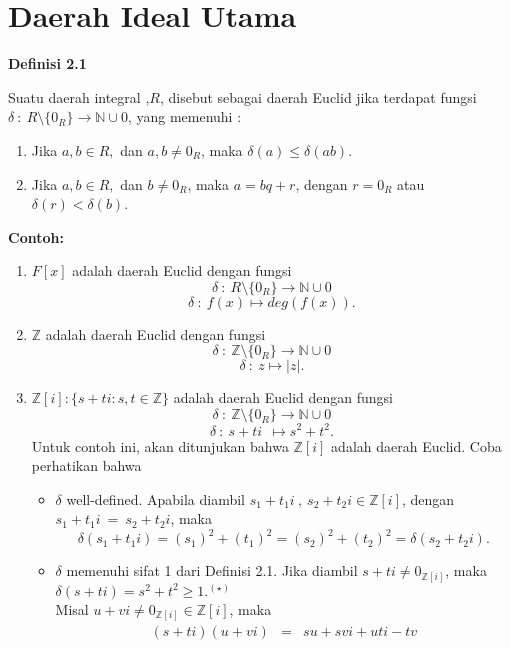 
\chapter{Daerah Ideal Utama}
\textbf{Definisi 2.1}
\par 	Suatu daerah integral ,$R$, disebut sebagai daerah Euclid  jika terdapat fungsi $\delta~:~ R\setminus \{0_R\} \rightarrow \mathbb{N}\cup {0}$, yang memenuhi : 
	\begin{enumerate}
	\item Jika $a,b \in R,$ dan $a,b \ne 0_R$, maka $ \delta(a) \le \delta (ab).$
	\item Jika $a,b \in R,$ dan $b \ne 0_R$, maka $a=bq+r$, dengan $r=0_R$ atau $\delta (r) < \delta(b)$.
	\end{enumerate}
	\textbf{Contoh:}
	\begin{enumerate}
	\item $F[x]$ adalah daerah Euclid dengan fungsi $$\delta~:~ R\setminus \{0_R\} \rightarrow \mathbb{N}\cup {0}$$ $$\delta~:~f(x) \mapsto deg(f(x)).$$
	\item $\mathbb{Z}$ adalah daerah Euclid dengan fungsi $$\delta~:~ \mathbb{Z}\setminus \{0_R\} \rightarrow \mathbb{N}\cup {0}$$ $$\delta~:~z \mapsto |z|.$$
	\item $\mathbb{Z}[\textit{i}] : \{ s + t\textit{i} : s,t \in \mathbb{Z}\}$ adalah daerah Euclid dengan fungsi $$\delta~:~ \mathbb{Z}\setminus \{0_R\} \rightarrow \mathbb{N}\cup {0}$$  $$\delta~:~  s + t\textit{i}~~\mapsto s^2+t^2.$$
	Untuk contoh ini, akan ditunjukan bahwa $\mathbb{Z}[\textit{i}]$ adalah daerah Euclid. Coba perhatikan bahwa
		\begin{itemize}
		\item $\delta$ well-defined. Apabila diambil  $s_1 + t_1\textit{i}~,~ s_2 + t_2\textit{i} \in \mathbb{Z}[\textit{i}]$, dengan $s_1 + t_1\textit{i}~=~ s_2 + t_2\textit{i}$, maka $$\delta(s_1 + t_1\textit{i}) = (s_1)^2 + (t_1)^2 = (s_2)^2 + (t_2)^2= \delta(s_2 +                                                         
		t_2\textit{i}).$$
		\item $\delta$ memenuhi sifat 1 dari Definisi 2.1.  Jika diambil $s+ t\textit{i} \ne 0_{\mathbb{Z}[\textit{i}]}$, maka $\delta (s+ t\textit{i}) = s^2 +t^2 \ge 1.^{(\star)} $ 
\\		Misal $u+ v\textit{i} \ne 0_{\mathbb{Z}[\textit{i}]} \in \mathbb{Z}[\textit{i}]$, maka
			$$\begin{array}{rcl}
			(s+ t\textit{i})(u+ v\textit{i}) &=& su + sv\textit{i} + ut\textit{i} - tv\\

\end{array}$$
\end{itemize}
\end{enumerate}
